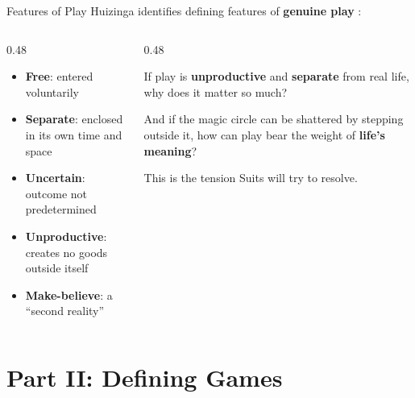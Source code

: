 \documentclass[aspectratio=169,11pt]{beamer}
\begin{document}
\begin{frame}[t]{Features of Play}
\footnotesize
Huizinga identifies defining features of \textbf{genuine play} \parencite{huizinga_homo_ludens}:

\vspace{0.1cm}
\begin{columns}[T]
\begin{column}{0.48\textwidth}
\begin{probox}
\scriptsize
\begin{itemize}
    \item \textbf{Free}: entered voluntarily
    \item \textbf{Separate}: enclosed in its own time and space
    \item \textbf{Uncertain}: outcome not predetermined
    \item \textbf{Unproductive}: creates no goods outside itself
    \item \textbf{Make-believe}: a ``second reality''
\end{itemize}
\end{probox}
\end{column}
\begin{column}{0.48\textwidth}
\begin{objectionbox}
\scriptsize
If play is \textbf{unproductive} and \textbf{separate} from real life, why does it matter so much?

\vspace{0.1cm}
And if the magic circle can be shattered by stepping outside it, how can play bear the weight of \textbf{life's meaning}?

\vspace{0.1cm}
This is the tension Suits will try to resolve.
\end{objectionbox}
\end{column}
\end{columns}
\end{frame}

\section{Part II: Defining Games}
\end{document}
